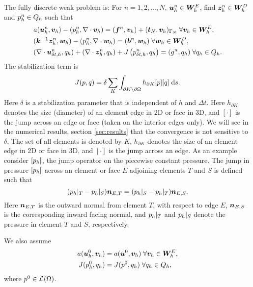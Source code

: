 The fully discrete weak problem is: For $n = 1,2, \ldots,N$, $\boldsymbol{u}_{h}^{n} \in \boldsymbol{W}^{E}_{h}$, find $\boldsymbol{z}_{h}^{n} \in \boldsymbol{W}^{D}_{h}$ and $p_h^{n} \in {Q}_{h} $ such that
\begin{subequations}
\begin{align}
&a(\boldsymbol{u}_{h}^{n},\boldsymbol{v}_{h})-(p_h^{n},\nabla \cdot \boldsymbol{v}_{h}) =(\boldsymbol{f}^{n},\boldsymbol{v}_{h})+(\boldsymbol{t}_{N},\boldsymbol{v}_{h})_{\Gamma_{N}}
\; \forall \boldsymbol{v}_{h}\in \boldsymbol{W}^{E}_{h},
\label{eqn:weak_fulldisc_elast_mom} \\
&(\boldsymbol{k^{-1}} \boldsymbol{z}_{h}^{n},\boldsymbol{w}_{h})-(p_h^{n},\nabla \cdot \boldsymbol{w}_{h})
= (\boldsymbol{b}^{n},\boldsymbol{w}_{h})
\; \forall \boldsymbol{w}_{h}\in \boldsymbol{W}^{D}_{h},
\label{eqn:weak_fulldisc_flux_mom} \\
&(\nabla \cdot {\boldsymbol{u}_{\delta t,h}^{n}},{q}_{h})+(\nabla \cdot \boldsymbol{z}_{h}^{n},{q}_{h}) + J\left({{p}_{\delta t,h}^{n}},{q}_{h}\right)
=(g^{n},{q}_{h})  \; \forall {q}_{h}\in {Q}_{h}.
\label{eqn:weak_fulldisc_mass}
\end{align}
\label{eqns:weak_fulldisc_system}
\end{subequations}
The stabilization term is
\begin{equation}
J(p,{q})= \delta \sum_{K} \int_{\partial K \backslash \partial \Omega} h_{\partial K} [p][{q}] \;\mbox{d}s.
\end{equation}
Here $\delta$ is a stabilization parameter that is independent of $h$ and $\Delta t $.  Here $ h_{\partial K} $ denotes the size (diameter) of an element edge in 2D or face in 3D, and $[\cdot]$ is the jump across an edge or face (taken on the interior edges only). We will see in the numerical results, section \ref{sec:results} that the convergence is not sensitive to $\delta$. The set of all elements is denoted by $K$, $ h_{\partial K} $ denotes the size of an element edge in 2D or face in 3D, and $[\cdot]$ is the jump across an edge. As an example consider $[p_h]$, the jump operator on the piecewise constant pressure.  The jump in pressure $[p_h]$ across an element or face $E$ adjoining elements $T$ and $S$ is defined such that
\begin{equation*}
(p_h|_{T} - p_h|_{S})  \boldsymbol{n}_{E,T}=(p_h|_{S} - p_h|_{T})  \boldsymbol{n}_{E,S}.
\end{equation*}
Here $\boldsymbol{n}_{E,T}$ is the outward normal from element $T$, with respect to edge $E$, $\boldsymbol{n}_{E,S}$ is the corresponding inward facing normal, and $p_h|_{T}$ and $p_h|_{S}$ denote the pressure in element $T$ and $S$, respectively.

We also assume
\begin{subequations}
\begin{align}
a(\boldsymbol{u}_{h}^{0},\boldsymbol{v}_{h})
&= a(\boldsymbol{u}^{0},\boldsymbol{v}_{h})\; \forall \boldsymbol{v}_{h}\in \boldsymbol{W}^{E}_{h},
\label{eqn:a_initial} \\
J(p_h^{0},{q}_{h}) &= J(p^{0},{q}_{h})\; \forall {q}_{h}\in {Q}_{h},
\label{eqn:p_initial}
\end{align}
\label{eqns:weak_disc_initial}
\end{subequations}
where $p^{0} \in \mathcal{L}(\Omega)$.


 